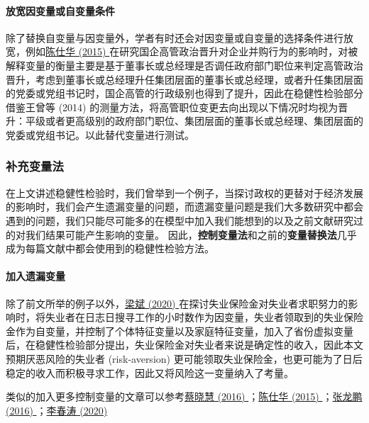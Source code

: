 \documentclass[11pt,a4paper]{ctexart}
\begin{document}
\paragraph{放宽因变量或自变量条件}

除了替换自变量与因变量外，学者有时还会对因变量或自变量的选择条件进行放宽，例如\href{https://xueshu.baidu.com/usercenter/paper/show?paperid=fc86e2886dc63d0cc631762016d87697&site=xueshu_se}{陈仕华
(2015)
}在研究国企高管政治晋升对企业并购行为的影响时，对被解释变量的衡量主要是基于董事长或总经理是否调任政府部门职位来判定高管政治晋升，考虑到董事长或总经理升任集团层面的董事长或总经理，或者升任集团层面的党委或党组书记时，国企高管的行政级别也得到了提升，因此在稳健性检验部分借鉴王曾等
(2014)
的测量方法，将高管职位变更去向出现以下情况时均视为晋升：平级或者更高级别的政府部门职位、集团层面的董事长或总经理、集团层面的党委或党组书记。以此替代变量进行测试。

\subsubsection{补充变量法}

在上文讲述稳健性检验时，我们曾举到一个例子，当探讨政权的更替对于经济发展的影响时，我们会产生遗漏变量的问题，而遗漏变量问题是我们大多数研究中都会遇到的问题，我们只能尽可能多的在模型中加入我们能想到的以及之前文献研究过的对我们结果可能产生影响的变量。
因此，\textbf{控制变量法}和之前的\textbf{变量替换法}几乎成为每篇文献中都会使用到的稳健性检验方法。

\paragraph{加入遗漏变量}

除了前文所举的例子以外，\href{https://kns.cnki.net/KCMS/detail/detail.aspx?dbcode=CJFQ&dbname=CJFDLAST2020&filename=JJYJ202003015&uid=WEEvREcwSlJHSldRa1FhcTdnTnhYWUN2MXh5K2o3djRZWGhKYtextbfJWkg1cz0=$9A4hF_YAuvQ5obgVAqNKPCYcEjKensW4IQMovwHtwkF4VYPoHbKxJw!!&v=MzAwOTJUM3FUcldNMUZyQ1VSN3FmWU9SdEZ5M2xXcjNQTHlmU1pMRzRITkhNckk5RVlZUjhlWDFMdXhZUzdEaDE=}{梁斌
(2020)
}在探讨失业保险金对失业者求职努力的影响时，将失业者在日志日搜寻工作的小时数作为因变量，失业者领取到的失业保险金作为自变量，并控制了个体特征变量以及家庭特征变量，加入了省份虚拟变量后，在稳健性检验部分提出，失业保险金对失业者来说是确定性的收入，因此本文预期厌恶风险的失业者
(risk-aversion)
更可能领取失业保险金，也更可能为了日后稳定的收入而积极寻求工作，因此又将风险这一变量纳入了考量。

类似的加入更多控制变量的文章可以参考\href{https://xueshu.baidu.com/usercenter/paper/show?paperid=0f2b233eb96ada98f02353ef66f55944&site=xueshu_se}{蔡晓慧
(2016)
}；\href{https://xueshu.baidu.com/usercenter/paper/show?paperid=fc86e2886dc63d0cc631762016d87697&site=xueshu_se}{陈仕华
(2015)
}；\href{https://xueshu.baidu.com/usercenter/paper/show?paperid=5c709096872a578771b4138f3b09df10&site=xueshu_se}{张龙鹏
(2016)
}；\href{https://xueshu.baidu.com/usercenter/paper/show?paperid=e116045880d5f16366d33f6da8e8dc66&site=xueshu_se}{李春涛
(2020)}
\end{document}
